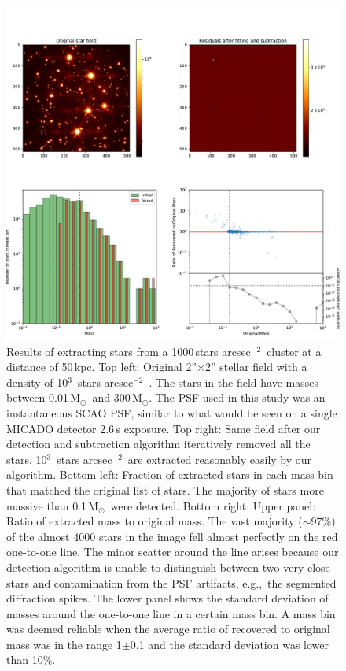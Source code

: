 \documentclass[referee]{aa}
\newcommand{\msun}{M$_\odot$~}
\newcommand{\msune}{M$_\odot$}
\newcommand{\s}{$\sim$}
\newcommand{\h}[1]{$^{#1}$}
\newcommand{\spa}{stars arcsec$^{-2}$~}
\begin{document}
\begin{appendix}
\begin{figure}
    \centering
    \includegraphics[width=\textwidth]{tbl_stats_dist=50000_rho=1000.pdf}
    \caption{Results of extracting stars from a 1000\,\spa cluster at a distance of 50\,kpc.
    Top left: Original 2''$\times$2'' stellar field with a density of 10\h3~\spa.
    The stars in the field have masses between 0.01\,\msun and 300\,\msune.
    The PSF used in this study was an instantaneous SCAO PSF, similar to what would be seen on a single MICADO detector 2.6\,s exposure.
    Top right: Same field after our detection and subtraction algorithm iteratively removed all the stars.
    10\h3~\spa are extracted reasonably easily by our algorithm.
    Bottom left: Fraction of extracted stars in each mass bin that matched the original list of stars.
    The majority of stars more massive than 0.1\,\msun were detected.
    Bottom right: Upper panel: Ratio of extracted mass to original mass.
    The vast majority (\s97\%) of the almost 4000 stars in the image fell almost perfectly on the red one-to-one line.
    The minor scatter around the line arises because our detection algorithm is unable to distinguish between two very close stars and contamination from the PSF artifacts, e.g.,\ the segmented diffraction spikes.
    The lower panel shows the standard deviation of masses around the one-to-one line in a certain mass bin.
    A mass bin was deemed reliable when the average ratio of recovered to original mass was in the range 1$\pm$0.1 and the standard deviation was lower than 10\%.}


\end{figure}
\end{appendix}
\end{document}
